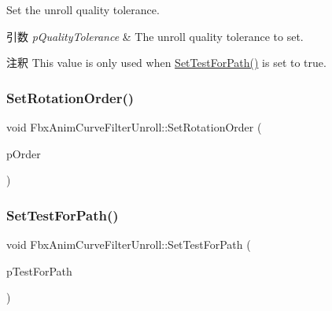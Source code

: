 Set the unroll quality tolerance. 
\begin{DoxyParams}{引数}
{\em p\+Quality\+Tolerance} & The unroll quality tolerance to set. \\
\hline
\end{DoxyParams}
\begin{DoxyRemark}{注釈}
This value is only used when \hyperlink{class_fbx_anim_curve_filter_unroll_af87dabf0628d09c9864ed445f11f8c66}{Set\+Test\+For\+Path()} is set to true. 
\end{DoxyRemark}
\mbox{\label{class_fbx_anim_curve_filter_unroll_a8332667ca1dba9998d511f5e25f6cfb2}} 
\subsubsection{\texorpdfstring{Set\+Rotation\+Order()}{SetRotationOrder()}}
{\footnotesize\ttfamily void Fbx\+Anim\+Curve\+Filter\+Unroll\+::\+Set\+Rotation\+Order (\begin{DoxyParamCaption}\item[{\hyperlink{class_fbx_euler_a7d5bec7eedb022b4dae56894ab7a9939}{Fbx\+Euler\+::\+E\+Order}}]{p\+Order }\end{DoxyParamCaption})}

\mbox{\label{class_fbx_anim_curve_filter_unroll_af87dabf0628d09c9864ed445f11f8c66}} 
\subsubsection{\texorpdfstring{Set\+Test\+For\+Path()}{SetTestForPath()}}
{\footnotesize\ttfamily void Fbx\+Anim\+Curve\+Filter\+Unroll\+::\+Set\+Test\+For\+Path (\begin{DoxyParamCaption}\item[{bool}]{p\+Test\+For\+Path }\end{DoxyParamCaption})}

